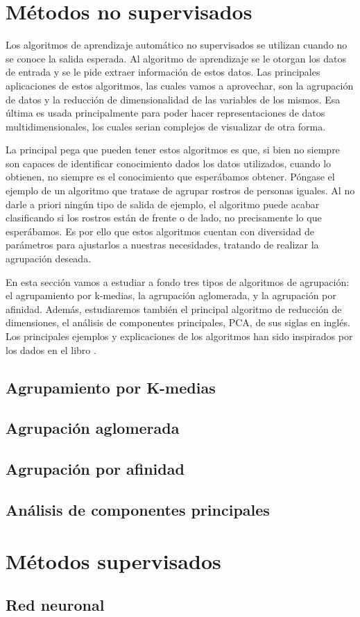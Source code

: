 \section{Métodos no supervisados}

Los algoritmos de aprendizaje automático no supervisados se utilizan cuando no se conoce la salida esperada. Al algoritmo de aprendizaje se le otorgan los datos de entrada y se le pide extraer información de estos datos. Las principales aplicaciones de estos algoritmos, las cuales vamos a aprovechar, son la agrupación de datos y la reducción de dimensionalidad de las variables de los mismos. Esa última es usada principalmente para poder hacer representaciones de datos multidimensionales, los cuales serian complejos de visualizar de otra forma.

La principal pega que pueden tener estos algoritmos es que, si bien no siempre son capaces de identificar conocimiento dados los datos utilizados, cuando lo obtienen, no siempre es el conocimiento que esperábamos obtener. Póngase el ejemplo de un algoritmo que tratase de agrupar rostros de personas iguales. Al no darle a priori ningún tipo de salida de ejemplo, el algoritmo puede acabar clasificando si los rostros están de frente o de lado, no precisamente lo que esperábamos. Es por ello que estos algoritmos cuentan con diversidad de parámetros para ajustarlos a nuestras necesidades, tratando de realizar la agrupación deseada.

En esta sección vamos a estudiar a fondo tres tipos de algoritmos de agrupación: el agrupamiento por k-medias, la agrupación aglomerada, y la agrupación por afinidad. Además, estudiaremos también el principal algoritmo de reducción de dimensiones, el análisis de componentes principales, PCA, de sus siglas en inglés. Los principales ejemplos y explicaciones de los algoritmos han sido inspirados por los dados en el libro \cite[Introduction to Machine Learning with Python]{machine}.

\subsection{Agrupamiento por K-medias}

\subsection{Agrupación aglomerada}

\subsection{Agrupación por afinidad}

\subsection{Análisis de componentes principales}

\section{Métodos supervisados}
\cite[Deep Learning with PyTorch]{pytorch}
\subsection{Red neuronal}